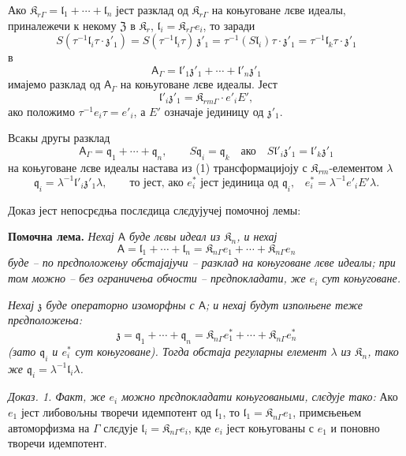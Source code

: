 \documentclass[11pt]{article}
\begin{document}
Ако \(\mathfrak K_{r\Gamma}=\mathfrak l_1+\cdots+\mathfrak l_n\) јест разклад од \(\mathfrak K_{r\Gamma}\) на коњуговане лєве идеалы, приналежечи к некому \(\mathfrak Z\) в \(\mathfrak K_r\), \(\mathfrak l_i=\mathfrak K_{r\Gamma}e_i\), то заради
\[
S(\tau^{-1}\mathfrak l_i\tau\cdot\mathfrak z'_1)
=S(\tau^{-1}\mathfrak l_i\tau)\,\mathfrak z'_1
=\tau^{-1}(S\mathfrak l_i)\tau\cdot\mathfrak z'_1
=\tau^{-1}\mathfrak l_k\tau\cdot\mathfrak z'_1
\]
в
\[
\tag{1}
\mathsf{A}_\Gamma=\mathfrak l'_1\mathfrak z'_1+\cdots+\mathfrak l'_n\mathfrak z'_1
\]
имајемо разклад од \(\mathsf{A}_\Gamma\) на коњуговане лєве идеалы. Јест
\[
\mathfrak l'_i\mathfrak z'_1=\mathfrak K_{rm\Gamma}\cdot e'_iE',
\]
ако положимо \(\tau^{-1}e_i\tau=e'_i\), а \(E'\) означаје јединицу од \(\mathfrak z'_1\).

Всакы другы разклад
\[
\tag{2}
\mathsf{A}_\Gamma=\mathfrak q_1+\cdots+\mathfrak q_n,\qquad
S\mathfrak q_i=\mathfrak q_k\quad\text{ако}\quad
S\mathfrak l'_i\mathfrak z'_1=\mathfrak l'_k\mathfrak z'_1
\]
на коњуговане лєве идеалы настава из (1) трансформацијоју с \(\mathfrak K_{rm}\)-елементом \(\lambda\)
\[
\mathfrak q_i=\lambda^{-1}\mathfrak l'_i\mathfrak z'_1\lambda,
\qquad
\text{то јест, ако \(e_i^*\) јест јединица од \(\mathfrak q_i\),}\quad
e_i^*=\lambda^{-1}e'_iE'\lambda.
\]

Доказ јест непосрєдња послєдица слєдујучеј помочној лемы:

\textbf{Помочна лема.} \emph{Нехај \(\mathsf{A}\) буде лєвы идеал из \(\mathfrak K_n\), и нехај}
\[
\mathsf{A}=\mathfrak l_1+\cdots+\mathfrak l_n
=\mathfrak K_{n\Gamma}e_1+\cdots+\mathfrak K_{n\Gamma}e_n
\]
\emph{буде -- по прєдположењу обстајајучи -- разклад на коњуговане лєве идеалы; при том можно -- без ограничења обчости -- прєдпокладати, же \(e_i\) сут коњуговане.}

\emph{Нехај \(\mathfrak z\) буде операторно изоморфны с \(\mathsf{A}\); и нехај будут изполњене теже прєдположења:}
\[
\mathfrak z=\mathfrak q_1+\cdots+\mathfrak q_n
=\mathfrak K_{n\Gamma}e_1^*+\cdots+\mathfrak K_{n\Gamma}e_n^*
\]
\emph{(зато \(\mathfrak q_i\) и \(e_i^*\) сут коњуговане). Тогда обстаја регуларны елемент \(\lambda\) из \(\mathfrak K_n\), тако же \(\mathfrak q_i=\lambda^{-1}\mathfrak l_i\lambda\).}

\emph{Доказ. 1. Факт, же \(e_i\) можно прєдпокладати коњуговаными, слєдује тако:} Ако \(e_1\) јест либовољны творечи идемпотент од \(\mathfrak l_1\), то \(\mathfrak l_1=\mathfrak K_{n\Gamma}e_1\), примєњењем автоморфизма на \(\Gamma\) слєдује \(\mathfrak l_i=\mathfrak K_{n\Gamma}e_i\), кде \(e_i\) јест коњугованы с \(e_1\) и поновно творечи идемпотент.
\end{document}
